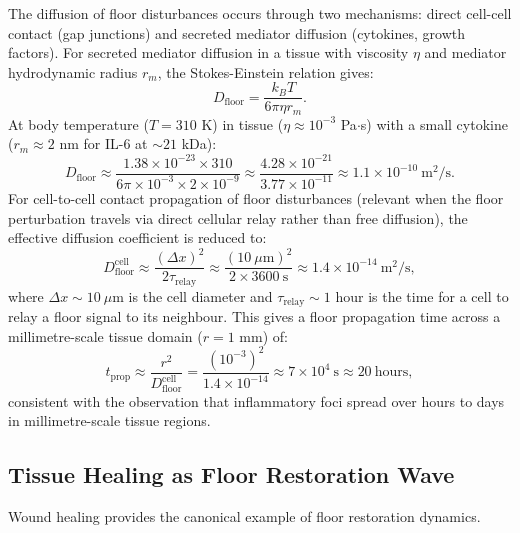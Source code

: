 The diffusion of floor disturbances occurs through two mechanisms: direct
cell-cell contact (gap junctions) and secreted mediator diffusion (cytokines,
growth factors).  For secreted mediator diffusion in a tissue with viscosity
$\eta$ and mediator hydrodynamic radius $r_m$, the Stokes-Einstein relation
gives:
\begin{equation}
  D_{\mathrm{floor}}
  = \frac{k_B T}{6\pi \eta r_m}.
  \label{eq:ch02b-stokes-einstein}
\end{equation}
At body temperature ($T = 310$ K) in tissue ($\eta \approx 10^{-3}$ Pa$\cdot$s)
with a small cytokine ($r_m \approx 2$ nm for IL-6 at $\sim 21$ kDa):
\[
  D_{\mathrm{floor}}
  \approx \frac{1.38 \times 10^{-23} \times 310}{6\pi \times 10^{-3} \times 2 \times 10^{-9}}
  \approx \frac{4.28 \times 10^{-21}}{3.77 \times 10^{-11}}
  \approx 1.1 \times 10^{-10}\ \mathrm{m}^2/\mathrm{s}.
\]
For cell-to-cell contact propagation of floor disturbances (relevant when
the floor perturbation travels via direct cellular relay rather than free
diffusion), the effective diffusion coefficient is reduced to:
\[
  D_{\mathrm{floor}}^{\mathrm{cell}}
  \approx \frac{(\Delta x)^2}{2\tau_{\mathrm{relay}}}
  \approx \frac{(10\ \mu\mathrm{m})^2}{2 \times 3600\ \mathrm{s}}
  \approx 1.4 \times 10^{-14}\ \mathrm{m}^2/\mathrm{s},
\]
where $\Delta x \sim 10\ \mu$m is the cell diameter and $\tau_{\mathrm{relay}}
\sim 1$ hour is the time for a cell to relay a floor signal to its neighbour.
This gives a floor propagation time across a millimetre-scale tissue domain
($r = 1$ mm) of:
\[
  t_{\mathrm{prop}} \approx \frac{r^2}{D_{\mathrm{floor}}^{\mathrm{cell}}}
  = \frac{(10^{-3})^2}{1.4 \times 10^{-14}}
  \approx 7 \times 10^4\ \mathrm{s} \approx 20\ \mathrm{hours},
\]
consistent with the observation that inflammatory foci spread over hours to
days in millimetre-scale tissue regions.

\subsection{Tissue Healing as Floor Restoration Wave}

Wound healing provides the canonical example of floor restoration dynamics.

